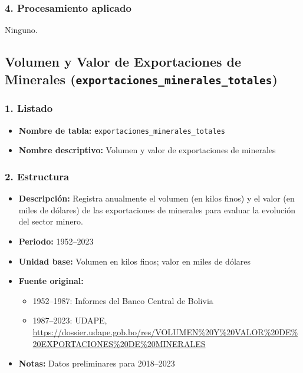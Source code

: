 \documentclass[12pt,a4paper]{article}
\begin{document}
\subsubsection*{4. Procesamiento aplicado}
Ninguno.

\newpage
\subsection{Volumen y Valor de Exportaciones de Minerales (\texttt{exportaciones\_minerales\_totales})}

\subsubsection*{1. Listado}
\begin{itemize}
  \item \textbf{Nombre de tabla:} \texttt{exportaciones\_minerales\_totales}
  \item \textbf{Nombre descriptivo:} Volumen y valor de exportaciones de minerales
\end{itemize}

\subsubsection*{2. Estructura}
\begin{itemize}
  \item \textbf{Descripción:} Registra anualmente el volumen (en kilos finos) y el valor (en miles de dólares) de las exportaciones de minerales para evaluar la evolución del sector minero.
  \item \textbf{Periodo:} 1952--2023
  \item \textbf{Unidad base:} Volumen en kilos finos; valor en miles de dólares
  \item \textbf{Fuente original:}
    \begin{itemize}
      \item 1952--1987: Informes del Banco Central de Bolivia
      \item 1987--2023: UDAPE, \url{https://dossier.udape.gob.bo/res/VOLUMEN%20Y%20VALOR%20DE%20EXPORTACIONES%20DE%20MINERALES}
    \end{itemize}
  \item \textbf{Notas:} Datos preliminares para 2018--2023
\end{itemize}
\end{document}
